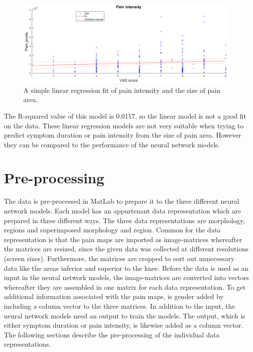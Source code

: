 \begin{figure} [H]
\centering
\includegraphics[width=1\textwidth]{figures/painRegression}
\caption{A simple linear regression fit of pain intensity and the size of pain area.}
\label{fig:painRegression}
\end{figure}

\noindent
The R-squared value of this model is 0.0117, so the linear model is not a good fit on the data. 
These linear regression models are not very suitable when trying to predict symptom duration or pain intensity from the size of pain area. However they can be compared to the performance of the neural network models.  



\section{Pre-processing}
The data is pre-processed in MatLab to prepare it to the three different neural network models. Each model has an appurtenant data representation which are prepared in three different ways. The three data representations are morphology, regions and superimposed morphology and region. Common for the data representation is that the pain maps are imported as image-matrices whereafter the matrices are resized, since the given data was collected at different resolutions (screen sizes). Furthermore, the matrices are cropped to sort out unnecessary data like the areas inferior and superior to the knee.
Before the data is used as an input in the neural network models, the image-matrices are converted into vectors whereafter they are assembled in one matrix for each data representation. To get additional information associated with the pain maps, is gender added by including a column vector to the three matrices. 
In addition to the input, the neural network models need an output to train the models. The output, which is either symptom duration or pain intensity, is likewise added as a column vector. 
The following sections describe the pre-processing of the individual data representations. 

